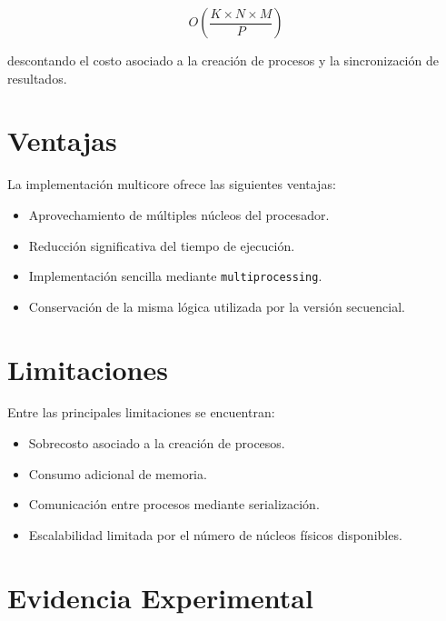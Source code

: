 \[
O\left(\frac{K \times N \times M}{P}\right)
\]

descontando el costo asociado a la creación de procesos y la sincronización de resultados.

\section{Ventajas}

La implementación multicore ofrece las siguientes ventajas:

\begin{itemize}

\item Aprovechamiento de múltiples núcleos del procesador.

\item Reducción significativa del tiempo de ejecución.

\item Implementación sencilla mediante \texttt{multiprocessing}.

\item Conservación de la misma lógica utilizada por la versión secuencial.

\end{itemize}

\section{Limitaciones}

Entre las principales limitaciones se encuentran:

\begin{itemize}

\item Sobrecosto asociado a la creación de procesos.

\item Consumo adicional de memoria.

\item Comunicación entre procesos mediante serialización.

\item Escalabilidad limitada por el número de núcleos físicos disponibles.

\end{itemize}

\section{Evidencia Experimental}

